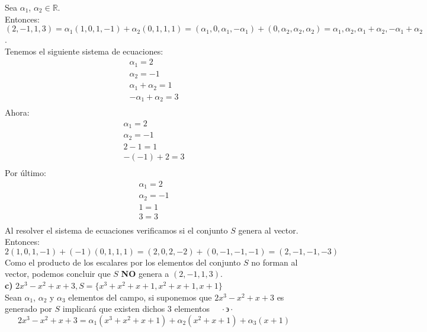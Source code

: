 \documentclass[letterpaper]{article}
\newcommand{\tq}{ \quad \cdot  \backepsilon \cdot \quad }
\renewcommand{\*}{\cdot}
\theoremstyle{definition}
\begin{document}
Sea $\alpha _1$, $\alpha _2 \in \mathbb{R}$.\\
Entonces: $(2,-1,1,3)=\alpha_{1}(1,0,1,-1)+\alpha_{2}(0,1,1,1)= (\alpha_{1},0,\alpha_{1},-\alpha_{1})+(0,\alpha_{2},\alpha_{2},\alpha_{2})= \alpha_{1},\alpha_{2},\alpha_{1}+\alpha_{2},-\alpha_{1}+\alpha_{2}$.\\
Tenemos el siguiente sistema de ecuaciones:\\
\begin{eqnarray*}
\alpha_{1}=2\\
\alpha_{2} = -1\\
\alpha_{1}+\alpha_{2}=1\\
-\alpha_{1}+\alpha_{2}=3\\
\end{eqnarray*}
Ahora:\\
\begin{eqnarray*}
\alpha_{1}=2\\
\alpha_{2}= -1\\
2-1  =1\\
-(-1)+2 = 3\\
\end{eqnarray*}
Por último:
\begin{eqnarray*}
\alpha_{1}=2\\
\alpha_{2}=-1\\
1=1\\
3=3\\
\end{eqnarray*}
Al resolver el sistema de ecuaciones verificamos si el conjunto $S$ genera al vector. Entonces:
\[2(1,0,1,-1)+(-1)(0,1,1,1)=(2,0,2,-2)+(0,-1,-1,-1)=(2,-1,-1,-3)\]
Como el producto de los escalares por los elementos del conjunto $S$ no forman al vector, podemos concluir que $S$ \textbf{NO} genera a $(2,-1,1,3)$.\\

\textbf{c)} $2x^3 - x^2 + x + 3, S =  \lbrace x^3 + x^2 + x +1, x^2 + x +1, x +1 \rbrace$\\

Sean $\alpha_1 $, $\alpha_2$ y $\alpha_3$ elementos del campo, si suponemos que $2x^3 - x^2 + x + 3$ es generado por $S$ implicará que existen dichos 3 elementos $\tq$ 
\[ 2x^3 - x^2 + x + 3 = \alpha_1 (x^3 + x^2 + x +1) + \alpha_2 (x^2 + x +1) + \alpha_3 (x +1) \]
\end{document}
